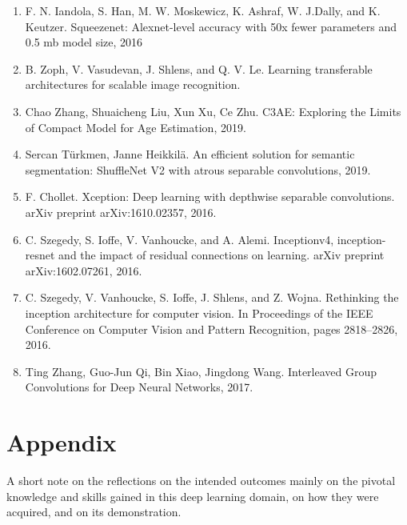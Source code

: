 \documentclass{article}
\begin{document}
\begin{enumerate}
    \item F. N. Iandola, S. Han, M. W. Moskewicz, K. Ashraf, W. J.Dally, and K. Keutzer. Squeezenet: Alexnet-level accuracy with 50x fewer parameters and 0.5 mb model size, 2016
    \item B. Zoph, V. Vasudevan, J. Shlens, and Q. V. Le. Learning transferable architectures for scalable image recognition.
    \item Chao Zhang, Shuaicheng Liu, Xun Xu, Ce Zhu. C3AE: Exploring the Limits of Compact Model for Age Estimation, 2019.
    \item Sercan Türkmen, Janne Heikkilä. An efficient solution for semantic segmentation: ShuffleNet V2 with atrous separable convolutions, 2019.
    \item F. Chollet. Xception: Deep learning with depthwise separable convolutions. arXiv preprint arXiv:1610.02357, 2016.
    \item C. Szegedy, S. Ioffe, V. Vanhoucke, and A. Alemi. Inceptionv4, inception-resnet and the impact of residual connections on learning. arXiv preprint arXiv:1602.07261, 2016.
    \item C. Szegedy, V. Vanhoucke, S. Ioffe, J. Shlens, and Z. Wojna. Rethinking the inception architecture for computer vision. In Proceedings of the IEEE Conference on Computer Vision and Pattern Recognition, pages 2818–2826, 2016.
    \item Ting Zhang, Guo-Jun Qi, Bin Xiao, Jingdong Wang. Interleaved Group Convolutions for Deep Neural Networks, 2017.
\end{enumerate}

\appendix
\section*{Appendix}

A short note on the reflections on the intended outcomes mainly on the pivotal knowledge and skills gained in this deep learning domain, on how they were acquired, and on its demonstration.
\end{document}

